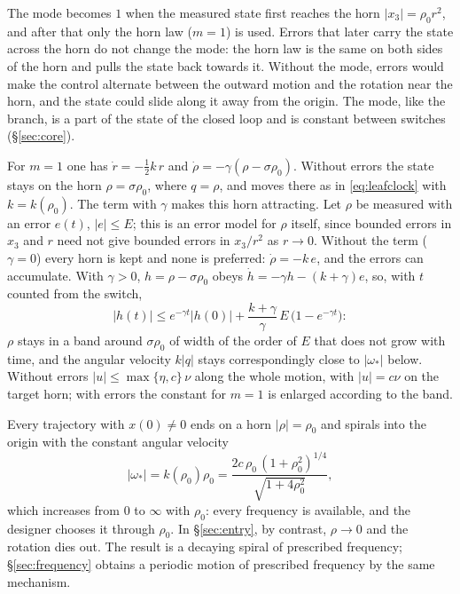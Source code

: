 \documentclass[11pt,reqno]{amsart}
\theoremstyle{plain}
\theoremstyle{definition}
\theoremstyle{remark}
\begin{document}
The mode becomes $1$ when the measured state first reaches the horn $|x_3|=\rho_0r^{2}$, and after that only the horn law ($m=1$) is used. Errors that later carry the state across the horn do not change the mode: the horn law is the same on both sides of the horn and pulls the state back towards it. Without the mode, errors would make the control alternate between the outward motion and the rotation near the horn, and the state could slide along it away from the origin. The mode, like the branch, is a part of the state of the closed loop and is constant between switches (\S\ref{sec:core}).

For $m=1$ one has $\dot r=-\frac12k\,r$ and $\dot\rho=-\gamma(\rho-\sigma\rho_0)$. Without errors the state stays
on the horn $\rho=\sigma\rho_0$, where $q=\rho$, and moves there as in \eqref{eq:leafclock} with $k=k(\rho_0)$. The
term with $\gamma$ makes this horn attracting. Let $\rho$ be measured with an error $e(t)$,
$|e|\le E$; this is an error model for $\rho$ itself, since bounded errors in $x_3$ and $r$ need not give bounded
errors in $x_3/r^{2}$ as $r\to0$. Without the term ($\gamma=0$) every horn is kept and none is preferred:
$\dot\rho=-k\,e$, and the errors can accumulate. With $\gamma>0$, $h=\rho-\sigma\rho_0$ obeys
$\dot h=-\gamma h-(k+\gamma)e$, so, with $t$ counted from the switch,
\[
  |h(t)|\le e^{-\gamma t}|h(0)|+\frac{k+\gamma}{\gamma}\,E\,\bigl(1-e^{-\gamma t}\bigr):
\]
$\rho$ stays in a band around $\sigma\rho_0$ of width of the order of $E$ that does not grow with time, and the
angular velocity $k|q|$ stays correspondingly close to $|\omega_*|$ below. Without errors
$|u|\le\max\{\eta,c\}\,\nu$ along the whole motion, with $|u|=c\nu$ on the target horn; with errors the constant
for $m=1$ is enlarged according to the band.

Every trajectory with $x(0)\ne0$ ends on a horn $|\rho|=\rho_0$ and spirals into the origin with the constant angular
velocity
\begin{equation}\label{eq:freq}
  |\omega_*|=k(\rho_0)\rho_0=\frac{2c\,\rho_0\,(1+\rho_0^{2})^{1/4}}{\sqrt{1+4\rho_0^{2}}},
\end{equation}
which increases from $0$ to $\infty$ with $\rho_0$: every frequency is available, and the designer chooses
it through $\rho_0$. In \S\ref{sec:entry}, by contrast, $\rho\to0$ and the rotation dies out. The result is a
decaying spiral of prescribed frequency; \S\ref{sec:frequency} obtains a periodic motion of
prescribed frequency by the same mechanism.
\end{document}
